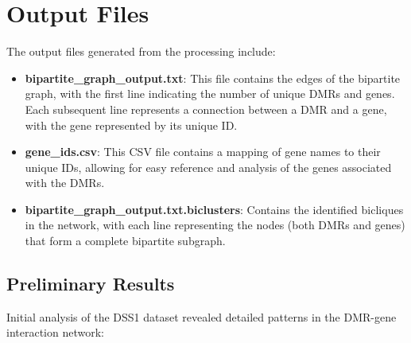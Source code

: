 \documentclass{article}
\begin{document}
\section{Output Files}
The output files generated from the processing include:

\begin{itemize}
    \item \textbf{bipartite_graph_output.txt}: This file contains the edges of the bipartite graph, with the first line indicating the number of unique DMRs and genes. Each subsequent line represents a connection between a DMR and a gene, with the gene represented by its unique ID.
    \item \textbf{gene_ids.csv}: This CSV file contains a mapping of gene names to their unique IDs, allowing for easy reference and analysis of the genes associated with the DMRs.
    \item \textbf{bipartite_graph_output.txt.biclusters}: Contains the identified bicliques in the network, with each line representing the nodes (both DMRs and genes) that form a complete bipartite subgraph.
\end{itemize}

\subsection{Preliminary Results}
Initial analysis of the DSS1 dataset revealed detailed patterns in the DMR-gene interaction network:
\end{document}
